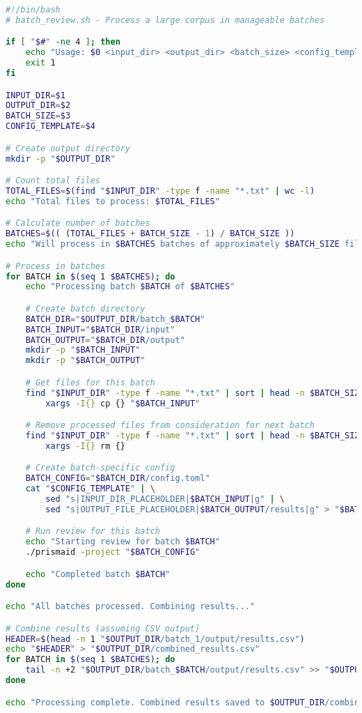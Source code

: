 \begin{commandbox}
\begin{lstlisting}[language=Bash]
#!/bin/bash
# batch_review.sh - Process a large corpus in manageable batches

if [ "$#" -ne 4 ]; then
    echo "Usage: $0 <input_dir> <output_dir> <batch_size> <config_template>"
    exit 1
fi

INPUT_DIR=$1
OUTPUT_DIR=$2
BATCH_SIZE=$3
CONFIG_TEMPLATE=$4

# Create output directory
mkdir -p "$OUTPUT_DIR"

# Count total files
TOTAL_FILES=$(find "$INPUT_DIR" -type f -name "*.txt" | wc -l)
echo "Total files to process: $TOTAL_FILES"

# Calculate number of batches
BATCHES=$(( (TOTAL_FILES + BATCH_SIZE - 1) / BATCH_SIZE ))
echo "Will process in $BATCHES batches of approximately $BATCH_SIZE files each"

# Process in batches
for BATCH in $(seq 1 $BATCHES); do
    echo "Processing batch $BATCH of $BATCHES"

    # Create batch directory
    BATCH_DIR="$OUTPUT_DIR/batch_$BATCH"
    BATCH_INPUT="$BATCH_DIR/input"
    BATCH_OUTPUT="$BATCH_DIR/output"
    mkdir -p "$BATCH_INPUT"
    mkdir -p "$BATCH_OUTPUT"

    # Get files for this batch
    find "$INPUT_DIR" -type f -name "*.txt" | sort | head -n $BATCH_SIZE | \
        xargs -I{} cp {} "$BATCH_INPUT"

    # Remove processed files from consideration for next batch
    find "$INPUT_DIR" -type f -name "*.txt" | sort | head -n $BATCH_SIZE | \
        xargs -I{} rm {}

    # Create batch-specific config
    BATCH_CONFIG="$BATCH_DIR/config.toml"
    cat "$CONFIG_TEMPLATE" | \
        sed "s|INPUT_DIR_PLACEHOLDER|$BATCH_INPUT|g" | \
        sed "s|OUTPUT_FILE_PLACEHOLDER|$BATCH_OUTPUT/results|g" > "$BATCH_CONFIG"

    # Run review for this batch
    echo "Starting review for batch $BATCH"
    ./prismaid -project "$BATCH_CONFIG"

    echo "Completed batch $BATCH"
done

echo "All batches processed. Combining results..."

# Combine results (assuming CSV output)
HEADER=$(head -n 1 "$OUTPUT_DIR/batch_1/output/results.csv")
echo "$HEADER" > "$OUTPUT_DIR/combined_results.csv"
for BATCH in $(seq 1 $BATCHES); do
    tail -n +2 "$OUTPUT_DIR/batch_$BATCH/output/results.csv" >> "$OUTPUT_DIR/combined_results.csv"
done

echo "Processing complete. Combined results saved to $OUTPUT_DIR/combined_results.csv"
\end{lstlisting}
\end{commandbox}

